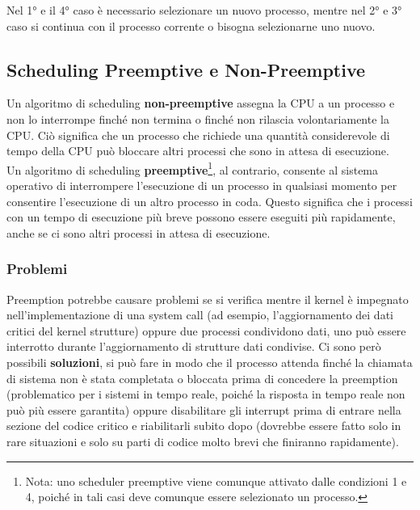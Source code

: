 \documentclass{article}
\begin{document}
Nel 1° e il 4° caso è necessario selezionare un nuovo processo, mentre nel 2° e 3° caso si continua con il processo corrente o bisogna selezionarne uno nuovo. 
\subsection{Scheduling Preemptive e Non-Preemptive}
Un algoritmo di scheduling \textbf{non-preemptive} assegna la CPU a un processo e non lo interrompe finché non termina o finché non rilascia volontariamente la CPU. Ciò significa che un processo che richiede una quantità considerevole di tempo della CPU può bloccare altri processi che sono in attesa di esecuzione.\\ 

Un algoritmo di scheduling \textbf{preemptive}\footnote{Nota: uno scheduler preemptive viene comunque attivato dalle condizioni 1 e 4, poiché in tali casi deve comunque essere selezionato un processo.}, al contrario, consente al sistema operativo di interrompere l'esecuzione di un processo in qualsiasi momento per consentire l'esecuzione di un altro processo in coda. Questo significa che i processi con un tempo di esecuzione più breve possono essere eseguiti più rapidamente, anche se ci sono altri processi in attesa di esecuzione. 
\subsubsection{Problemi}
Preemption potrebbe causare problemi se si verifica mentre il kernel è impegnato nell'implementazione di una system call (ad esempio, l'aggiornamento dei dati critici del kernel strutture) oppure due processi condividono dati, uno può essere interrotto durante l'aggiornamento di strutture dati condivise. Ci sono però possibili \textbf{soluzioni}, si può fare in modo che il processo attenda finché la chiamata di sistema non è stata completata o bloccata prima di concedere la preemption (problematico per i sistemi in tempo reale, poiché la risposta in tempo reale non può più essere garantita) oppure disabilitare gli interrupt prima di entrare nella sezione del codice critico e riabilitarli subito dopo (dovrebbe essere fatto solo in rare situazioni e solo su parti di codice molto brevi che finiranno rapidamente). \\
\end{document}

